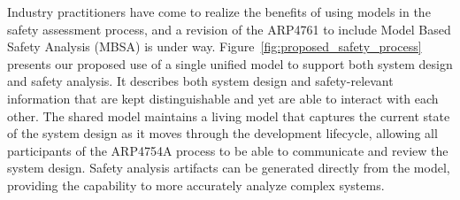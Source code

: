 Industry practitioners have come to realize the benefits of using models in the safety assessment process, and a revision of the ARP4761 to include Model Based Safety Analysis (MBSA) is under way.
Figure~\ref{fig:proposed_safety_process} presents our proposed use of a single unified model to support both system design and safety analysis. It describes both system design and safety-relevant information %
that are kept distinguishable and yet are able to interact with each other. The shared model maintains a living model that captures the current state of the system design as it moves through the development lifecycle, allowing all participants of the ARP4754A process to be able to communicate and review the system design. Safety analysis artifacts can be generated directly from the model, %
providing
the capability to more accurately analyze complex systems.

